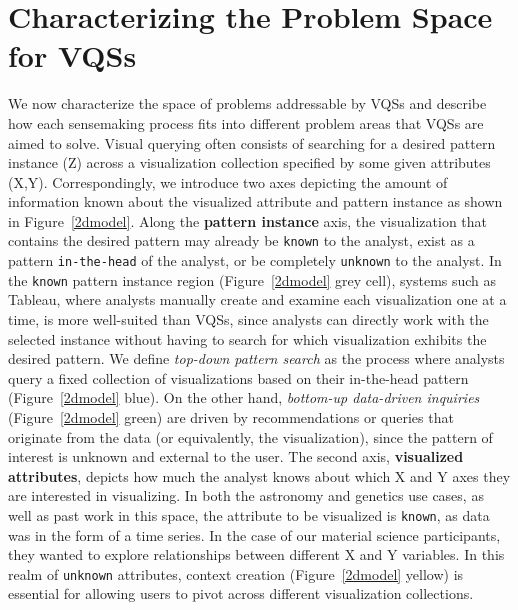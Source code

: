  \section{Characterizing the Problem Space for VQSs\label{appdx:problem_space}}
 We now characterize the space of problems addressable by VQSs and describe how each sensemaking process fits into different problem areas that VQSs are aimed to solve. Visual querying often consists of searching for a desired pattern instance (Z) across a visualization collection specified by some given attributes (X,Y). Correspondingly, we introduce two axes depicting the amount of information known about the visualized attribute and pattern instance as shown in Figure~\ref{2dmodel}.
 \npar Along the \textbf{pattern instance} axis, the visualization that contains the desired pattern may already be \texttt{known} to the analyst, exist as a pattern \texttt{in-the-head} of the analyst, or be completely \texttt{unknown} to the analyst. In the \texttt{known} pattern instance region (Figure~\ref{2dmodel} grey cell), systems such as Tableau, where analysts manually create and examine each visualization one at a time, is more well-suited than VQSs, since analysts can directly work with the selected instance without having to search for which visualization exhibits the desired pattern. We define \textit{top-down pattern search} as the process where analysts query a fixed collection of visualizations based on their in-the-head pattern (Figure~\ref{2dmodel} blue). On the other hand, \textit{bottom-up data-driven inquiries} (Figure~\ref{2dmodel} green) are driven by recommendations or queries that originate from the data (or equivalently, the visualization), since the pattern of interest is unknown and external to the user.
 \npar The second axis, \textbf{visualized attributes},
 depicts how much the analyst
 knows about which X and Y axes
 they are interested in visualizing.
 In both the astronomy and genetics use cases,
 as well as past work in this space, the attribute to be visualized is \texttt{known}, as data was in the form of a time series. In the case of our material science participants, they wanted to explore relationships between different
 X and Y variables. In this realm of \texttt{unknown} attributes, context creation (Figure~\ref{2dmodel} yellow) is
 essential for allowing users to pivot across different visualization collections.
